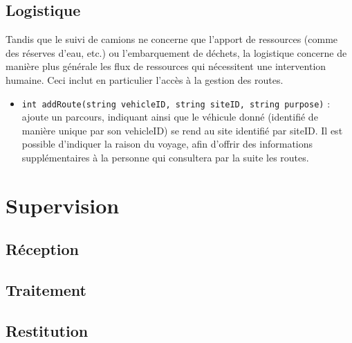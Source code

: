 \subsection{Logistique}

Tandis que le suivi de camions ne concerne que l'apport de ressources (comme des réserves d'eau, etc.) ou l'embarquement de déchets, la logistique concerne de manière plus générale les flux de ressources qui nécessitent une intervention humaine. Ceci inclut en particulier l'accès à la gestion des routes.

\begin{itemize}
\item \texttt{int addRoute(string vehicleID, string siteID, string purpose)} : ajoute un parcours, indiquant ainsi que le véhicule donné (identifié de manière unique par son vehicleID) se rend au site identifié par siteID. Il est possible d'indiquer la raison du voyage, afin d'offrir des informations supplémentaires à la personne qui consultera par la suite les routes.
\end{itemize}


\section{Supervision}

\subsection{Réception}

\subsection{Traitement}

\subsection{Restitution}

